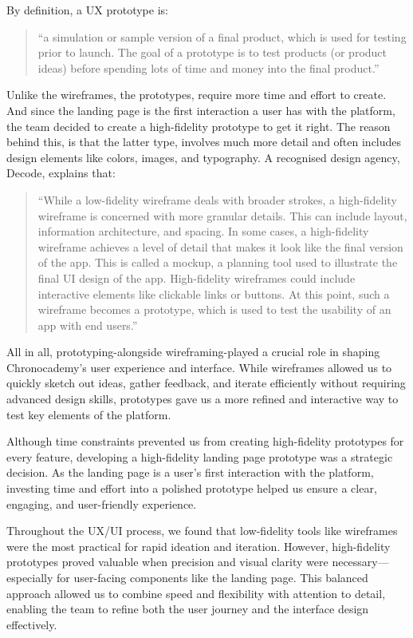 By definition, a UX prototype is:
\begin{quote}
    ``a simulation or sample version of a final product, which is used for
    testing prior to launch.
    The goal of a prototype is to test products (or
    product ideas) before spending lots of time and money into the final
    product.''\cite[UX Deliverables]{uxDeliverables}
\end{quote}

Unlike the wireframes, the prototypes, require more time and effort to create.
And since the landing page is the first interaction a user has with the platform, the team decided to create a high-fidelity prototype to get it right.
The reason behind this, is that the latter type, involves much more detail and often includes design elements like colors, images, and typography.
A recognised design agency, Decode, explains that:
\begin{quote}
    ``While a low-fidelity wireframe deals with broader strokes, a high-fidelity wireframe is concerned with more granular details.
This can include layout, information architecture, and spacing.
In some cases, a high-fidelity wireframe achieves a level of detail that makes it look like the final version of the app.
This is called a mockup, a planning tool used to illustrate the final UI design of the app.
High-fidelity wireframes could include interactive elements like clickable links or buttons.
At this point, such a wireframe becomes a prototype, which is used to test the usability of an app with end users.''\cite[Low-fidelity vs High-fidelity]{lowFidelity}
\end{quote}

All in all, prototyping-alongside wireframing-played a crucial role in shaping Chronocademy’s user experience and interface.
While wireframes allowed us to quickly sketch out ideas, gather feedback, and iterate efficiently without requiring advanced design skills, prototypes gave us a more refined and interactive way to test key elements of the platform.

Although time constraints prevented us from creating high-fidelity prototypes for every feature, developing a high-fidelity landing page prototype was a strategic decision.
As the landing page is a user's first interaction with the platform, investing time and effort into a polished prototype helped us ensure a clear, engaging, and user-friendly experience.

Throughout the UX/UI process, we found that low-fidelity tools like wireframes were the most practical for rapid ideation and iteration.
However, high-fidelity prototypes proved valuable when precision and visual clarity were necessary—especially for user-facing components like the landing page.
This balanced approach allowed us to combine speed and flexibility with attention to detail, enabling the team to refine both the user journey and the interface design effectively.

